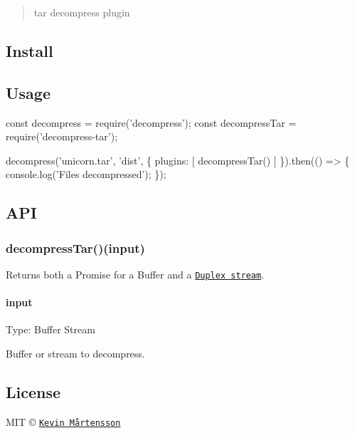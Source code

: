 \begin{quote}
tar decompress plugin \end{quote}


\subsection*{Install}




\subsection*{Usage}


\begin{DoxyCode}
const decompress = require('decompress');
const decompressTar = require('decompress-tar');

decompress('unicorn.tar', 'dist', \{
  plugins: [
    decompressTar()
  ]
\}).then(() => \{
  console.log('Files decompressed');
\});
\end{DoxyCode}


\subsection*{A\+PI}

\subsubsection*{decompress\+Tar()(input)}

Returns both a Promise for a Buffer and a \href{https://nodejs.org/api/stream.html#stream_class_stream_duplex}{\tt Duplex stream}.

\paragraph*{input}

Type\+: {\ttfamily Buffer} {\ttfamily Stream}

Buffer or stream to decompress.

\subsection*{License}

M\+IT © \href{https://github.com/kevva}{\tt Kevin Mårtensson} 